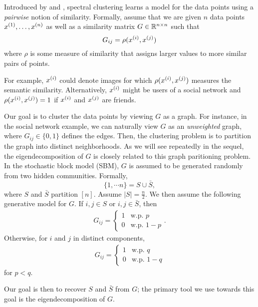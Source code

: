 Introduced by \citet{shi2000normalized} and \citet{ng2002spectral}, spectral clustering learns a model for the data points using a \emph{pairwise} notion of similarity. Formally, assume that we are given $n$ data points $x\sp{1}, \dots, x\sp{n}$ as well as a similarity matrix $G \in \bbR^{n\times n}$ such that 
\begin{equation}
    G_{ij} = \rho (x\sp{i}, x\sp{j})
\end{equation}
where $\rho$ is some measure of similarity that assigns larger values to more similar pairs of points. 

For example, $x\sp{i}$ could denote images for which $\rho (x\sp{i}, x\sp{j})$ measures the semantic similarity. Alternatively, $x\sp{i}$ might be users of a social network and $\rho (x\sp{i}, x\sp{j}) = 1$ if $x\sp{i}$ and $x\sp{j}$ are friends. 

Our goal is to cluster the data points by viewing $G$ as a graph. For instance, in the social network example, we can naturally view $G$ as an \emph{unweighted} graph, where $G_{ij} \in \{0, 1\}$ defines the edges. Then, the clustering problem is to partition the graph into distinct neighborhoods. As we will see repeatedly in the sequel, the eigendecomposition of $G$ is closely related to this graph paritioning problem.
In the stochastic block model (SBM), $G$ is assumed to be generated randomly from two hidden communities. Formally, 
\begin{equation}
    \{ 1, \cdots n \} = S \cup \bar{S},
\end{equation}
where $S$ and $\bar{S}$ partition $[n]$. Assume $|S| = \frac{n}{2}$. We then assume the following generative model for $G$. 
If $i,j \in S$ or $i,j \in \bar{S}$, then 
\begin{align}
    G_{ij} = \begin{cases}
        1 &\text{w.p. $p$} \\
        0 &\text{w.p. $1-p$} \end{cases}.
\end{align} 
Otherwise, for $i$ and $j$ in distinct components, 
\begin{align}
    G_{ij} = \begin{cases}
        1 &\text{w.p. $q$} \\
        0 &\text{w.p. $1-q$} \end{cases}
\end{align} 
for $p < q$.

Our goal is then to recover $S$ and $\bar{S}$ from $G$; the primary tool we use towards this goal is the eigendecomposition of $G$.


